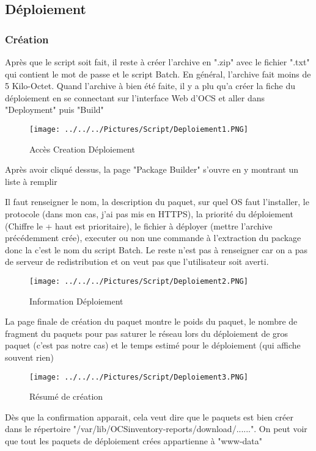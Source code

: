 \documentclass[11pt,a4paper,oneside]{article}
\begin{document}
\subsection{Déploiement}
\subsubsection{Création}
Après que le script soit fait, il reste à créer l'archive en ".zip" avec le fichier ".txt" qui contient le mot de passe et le script Batch. En général, l'archive fait moins de 5 Kilo-Octet. Quand l'archive à bien été faite, il y a plu qu'a créer la fiche du déploiement en se connectant sur l'interface Web d'OCS et aller dans "Deployment" puis "Build"
\\
\begin{figure}[hbtp]
\centering
\texttt{[image: ../../../Pictures/Script/Deploiement1.PNG]}
\caption{Accès Creation Déploiement}
\end{figure}

Après avoir cliqué dessus, la page "Package Builder" s'ouvre en y montrant un liste à remplir

Il faut renseigner le nom, la description du paquet, sur quel OS faut l'installer, le protocole (dans mon cas, j'ai pas mis en HTTPS), la priorité du déploiement (Chiffre le + haut est prioritaire), le fichier à déployer (mettre l'archive précédemment crée), executer ou non une commande à l'extraction du package donc la c'est le nom du script Batch. Le reste n'est pas à renseigner car on a pas de serveur de redistribution et on veut pas que l'utilisateur soit averti.
\begin{figure}[hbtp]
\centering
\texttt{[image: ../../../Pictures/Script/Deploiement2.PNG]}
\caption{Information Déploiement}
\end{figure}
\newpage

La page finale de création du paquet montre le poids du paquet, le nombre de fragment du paquets pour pas saturer le réseau lors du déploiement de gros paquet (c'est pas notre cas) et le temps estimé pour le déploiement (qui affiche souvent rien)

\begin{figure}[hbtp]
\centering
\texttt{[image: ../../../Pictures/Script/Deploiement3.PNG]}
\caption{Résumé de création}
\end{figure}

Dès que la confirmation apparait, cela veut dire que le paquets est bien créer dans le répertoire "/var/lib/OCSinventory-reports/download/......". On peut voir que tout les paquets de déploiement crées appartienne à "www-data"
\end{document}
